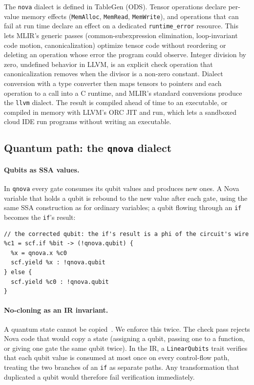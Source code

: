 \documentclass[11pt]{article}
\begin{document}
The \texttt{nova} dialect is defined in TableGen (ODS). Tensor operations declare per-value memory effects
(\texttt{MemAlloc}, \texttt{MemRead}, \texttt{MemWrite}), and operations that can fail at run time declare an effect
on a dedicated \texttt{runtime\_error} resource. This lets MLIR's generic passes (common-subexpression elimination,
loop-invariant code motion, canonicalization) optimize tensor code without reordering or deleting an operation whose
error the program could observe. Integer division by zero, undefined behavior in LLVM, is an explicit check
operation that canonicalization removes when the divisor is a non-zero constant. Dialect conversion with a type
converter then maps tensors to pointers and each operation to a call into a C runtime, and MLIR's standard
conversions produce the \texttt{llvm} dialect. The result is compiled ahead of time to an executable, or compiled in
memory with LLVM's ORC JIT and run, which lets a sandboxed cloud IDE run programs without writing an executable.

\subsection{Quantum path: the \texttt{qnova} dialect}
\label{sec:quantum}

\paragraph{Qubits as SSA values.} In \texttt{qnova} every gate consumes its qubit values and produces new ones. A
Nova variable that holds a qubit is rebound to the new value after each gate, using the same SSA construction as
for ordinary variables; a qubit flowing through an \texttt{if} becomes the \texttt{if}'s result:

\begin{lstlisting}[language=MLIR]
%bit, %a1 = qnova.measure %a0
// the corrected qubit: the if's result is a phi of the circuit's wire
%c1 = scf.if %bit -> (!qnova.qubit) {
  %x = qnova.x %c0
  scf.yield %x : !qnova.qubit
} else {
  scf.yield %c0 : !qnova.qubit
}
\end{lstlisting}

\paragraph{No-cloning as an IR invariant.} A quantum state cannot be copied~\cite{wootters1982}. We enforce this
twice. The check pass rejects Nova code that would copy a state (assigning a qubit, passing one to a function, or
giving one gate the same qubit twice). In the IR, a \texttt{LinearQubits} trait verifies that each qubit value is
consumed at most once on every control-flow path, treating the two branches of an \texttt{if} as separate paths.
Any transformation that duplicated a qubit would therefore fail verification immediately.
\end{document}
